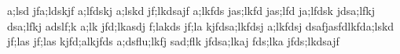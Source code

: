 a;lsd jfa;ldskjf a;lfdskj a;lskd jf;lkdsajf
a;lkfds jas;lkfd jas;lfd ja;lfdsk jdsa;lfkj
dsa;lfkj adslf;k a;lk jfd;lkasdj f;lakds jf;la
kjfdsa;lkfdsj a;lkfdsj dsafjasfdlkfda;lskd jf;las jf;las
kjfd;alkjfds a;dsflu;lkfj sad;flk jfdsa;lkaj
fds;lka jfds;lkdsajf
